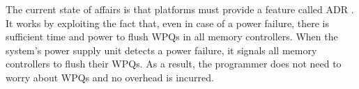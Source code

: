 The current state of affairs is that platforms must provide a feature called
\ac{ADR} \cite{volos2017whisper, rudoff2017persistent}. It works by exploiting
the fact that, even in case of a power failure, there is sufficient time and
power to flush \acp{WPQ} in all memory controllers. When the system's power
supply unit detects a power failure, it signals all memory controllers to flush
their \acp{WPQ}. As a result, the programmer does not need to worry about
\acp{WPQ} and no overhead is incurred.
